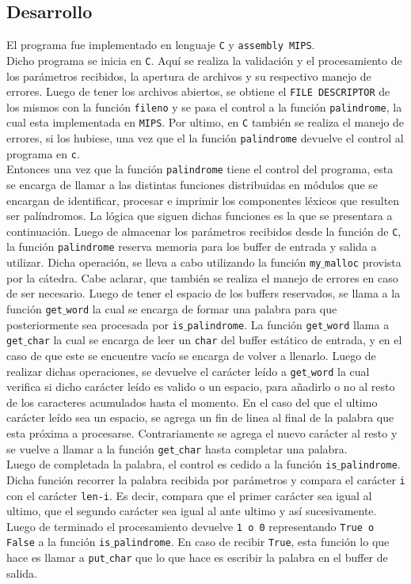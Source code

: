 \documentclass[a4paper, 10pt]{article}
\def\code#1{\texttt{#1}}
\newcommand\tab[1][0.5cm]{\hspace*{#1}}
\begin{document}
		\subsection{Desarrollo}
			El programa fue implementado en lenguaje \code{C} y \code{assembly MIPS}.
			\\
			\tab Dicho programa se inicia en \code{C}. Aquí se realiza la validación y el procesamiento de los parámetros recibidos, la apertura de archivos y su respectivo manejo de errores. Luego de tener los archivos abiertos, se obtiene el \code{FILE DESCRIPTOR} de los mismos con la función \code{fileno} y se pasa el control a la función \code{palindrome}, la cual esta implementada en \code{MIPS}. Por ultimo, en \code{C} también se realiza el manejo de errores, si los hubiese, una vez que el la función \code{palindrome} devuelve el control al programa en \code{c}.
			\\
			\tab Entonces una vez que la función \code{palindrome} tiene el control del programa, esta se encarga de llamar a las distintas funciones distribuidas en módulos que se encargan de identificar, procesar e imprimir los componentes léxicos que resulten ser palíndromos.
			La lógica que siguen dichas funciones es la que se presentara a continuación. Luego de almacenar los parámetros recibidos desde la función de \code{C}, la función \code{palindrome} reserva memoria para los buffer de entrada y salida a utilizar. Dicha operación, se lleva a cabo utilizando la función \code{my$\_$malloc} provista por la cátedra. Cabe aclarar, que también se realiza el manejo de errores en caso de ser necesario. Luego de tener el espacio de los buffers reservados, se llama a la función \code{get$\_$word} la cual se encarga de formar una palabra para que posteriormente sea procesada por \code{is$\_$palindrome}. La función \code{get$\_$word} llama a \code{get$\_$char} la cual se encarga de leer un \code{char} del buffer estático de entrada, y en el caso de que este se encuentre vacío se encarga de volver a llenarlo. Luego de realizar dichas operaciones, se devuelve el carácter leído a \code{get$\_$word} la cual verifica si dicho carácter leído es valido o un espacio, para añadirlo o no al resto de los caracteres acumulados hasta el momento. En el caso del que el ultimo carácter leído sea un espacio, se agrega un fin de linea al final de la palabra que esta próxima a procesarse. Contrariamente se agrega el nuevo carácter al resto y se vuelve a llamar a la función \code{get$\_$char} hasta completar una palabra.
			\\
			\tab Luego de completada la palabra, el control es cedido a la función \code{is$\_$palindrome}. Dicha función recorrer la palabra recibida por parámetros y compara el carácter \code{i} con el carácter \code{len-i}. Es decir, compara que el primer carácter sea igual al ultimo, que el segundo carácter sea igual al ante ultimo  y así sucesivamente. Luego de terminado el procesamiento devuelve \code{1 o 0} representando \code{True o False} a la función \code{is$\_$palindrome}. En caso de recibir \code{True}, esta función lo que hace es llamar a \code{put$\_$char} que lo que hace es escribir la palabra en el buffer de salida.
\end{document}
